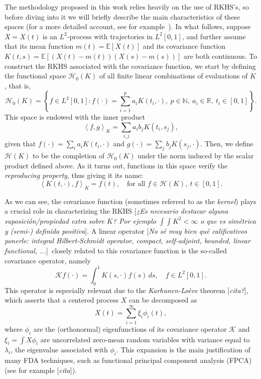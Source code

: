 \documentclass[ba]{imsart}
\numberwithin{equation}{section}
\theoremstyle{plain}
\newcommand{\N}{\mathbb{N}}
\newcommand{\R}{\mathbb{R}}
\newcommand\dotprod[2]{\left\langle #1, #2 \right\rangle}
\newcommand\incomment[1]{\color{red}[\textit{#1}]\color{black}}
\begin{document}
The methodology proposed in this work relies heavily on the use of RKHS's, so before diving into it we will briefly describe the main characteristics of these spaces (for a more detailed account, see for example~\citet{berlinet2004reproducing}). In what follows, suppose \(X=X(t)\) is an \(L^2\)-process with trajectories in \(L^2[0,1]\), and further assume that its mean function \(m(t)=\mathbb E[X(t)]\) and its covariance function \(K(t, s)= \mathbb E[(X(t) - m(t))(X(s) - m(s))]\) are both continuous. To construct the RKHS associated with the covariance function, we start by defining the functional space \(\mathcal H_0(K)\) of all finite linear combinations of evaluations of \(K\), that is,
\[
\mathcal H_0(K) = \left\{ f \in L^2[0,1]: f(\cdot) = \sum_{i=1}^p a_i K(t_i, \cdot), \ p \in \N, \ a_i \in \R, \ t_i \in [0, 1] \right\}.
\]
This space is endowed with the inner product
\[
\dotprod{f}{g}_K = \sum_{i, j} a_i b_j K(t_i, s_j),
\]
given that \(f(\cdot)=\sum_i a_i K(t_i, \cdot) \) and \(g(\cdot)=\sum_j b_j K(s_j, \cdot)\). Then, we define \(\mathcal H(K)\) to be the completion of \(\mathcal H_0(K)\) under the norm induced by the scalar product defined above. As it turns out, functions in this space verify the \textit{reproducing property}, thus giving it its name:
\begin{equation}\label{eq:reproducing-property}
  \dotprod{K(t, \cdot)}{f}_K = f(t), \quad \text{for all } f \in \mathcal H(K), \ t \in [0, 1].
\end{equation}

As we can see, the covariance function (sometimes referred to as the \textit{kernel}) plays a crucial role in characterizing the RKHS \incomment{¿Es necesario destacar alguna suposición/propiedad extra sobre \(K\)? Por ejemplo \(\int\int K^2 <\infty\) o que es simétrica y (semi-) definida positiva}. A linear operator \incomment{No sé muy bien qué calificativos ponerle: integral Hilbert-Schmidt operator, compact, self-adjoint, bounded, linear functional, ...}\  closely related to this covariance function is the so-called covariance operator, namely
\[
\mathcal Kf(\cdot) = \int_0^1 K(s, \cdot)f(s)\, ds, \quad f \in L^2[0, 1].
\]
This operator is especially relevant due to the \textit{Karhunen-Loève} theorem \incomment{cita?}, which asserts that a centered process \(X\) can be decomposed as
\begin{equation}\label{eq:karhunen-loeve}
X(t) = \sum_{i=1}^\infty \xi_i \phi_i(t),
\end{equation}
where \(\phi_i\) are the (orthonormal) eigenfunctions of its covariance operator \(\mathcal K\) and \(\xi_i = \int X\phi_i\) are uncorrelated zero-mean random variables with variance equal to \(\lambda_i\), the eigenvalue associated with \(\phi_i\). This expansion is the main justification of many FDA techniques, such as functional principal component analysis (FPCA) (see for example \incomment{cita}).
\end{document}
